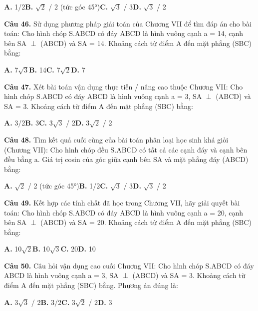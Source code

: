 \documentclass[11pt,a4paper]{article}
\begin{document}
\hspace*{1.5em}\textbf{A.} 1/2\quad\quad \textbf{B.} $\sqrt{2}$ / 2 (tức góc 45°)\quad\quad \textbf{C.} $\sqrt{3}$ / 3\quad\quad \textbf{D.} $\sqrt{3}$ / 2\par\vspace{2pt}
\textbf{\color{primary} Câu 46.} Sử dụng phương pháp giải toán của Chương VII để tìm đáp án cho bài toán: Cho hình chóp S.ABCD có đáy ABCD là hình vuông cạnh a = 14, cạnh bên SA $\perp$ (ABCD) và SA = 14. Khoảng cách từ điểm A đến mặt phẳng (SBC) bằng:\par
\hspace*{1.5em}\textbf{A.} 7$\sqrt{3}$\quad\quad \textbf{B.} 14\quad\quad \textbf{C.} 7$\sqrt{2}$\quad\quad \textbf{D.} 7\par\vspace{2pt}
\textbf{\color{primary} Câu 47.} Xét bài toán vận dụng thực tiễn / nâng cao thuộc Chương VII: Cho hình chóp S.ABCD có đáy ABCD là hình vuông cạnh a = 3, SA $\perp$ (ABCD) và SA = 3. Khoảng cách từ điểm A đến mặt phẳng (SBC) bằng:\par
\hspace*{1.5em}\textbf{A.} 3/2\quad\quad \textbf{B.} 3\quad\quad \textbf{C.} 3$\sqrt{3}$ / 2\quad\quad \textbf{D.} 3$\sqrt{2}$ / 2\par\vspace{2pt}
\textbf{\color{primary} Câu 48.} Tìm kết quả cuối cùng của bài toán phân loại học sinh khá giỏi (Chương VII): Cho hình chóp đều S.ABCD có tất cả các cạnh đáy và cạnh bên đều bằng a. Giá trị cosin của góc giữa cạnh bên SA và mặt phẳng đáy (ABCD) bằng:\par
\hspace*{1.5em}\textbf{A.} $\sqrt{2}$ / 2 (tức góc 45°)\quad\quad \textbf{B.} 1/2\quad\quad \textbf{C.} $\sqrt{3}$ / 3\quad\quad \textbf{D.} $\sqrt{3}$ / 2\par\vspace{2pt}
\textbf{\color{primary} Câu 49.} Kết hợp các tính chất đã học trong Chương VII, hãy giải quyết bài toán: Cho hình chóp S.ABCD có đáy ABCD là hình vuông cạnh a = 20, cạnh bên SA $\perp$ (ABCD) và SA = 20. Khoảng cách từ điểm A đến mặt phẳng (SBC) bằng:\par
\hspace*{1.5em}\textbf{A.} 10$\sqrt{2}$\quad\quad \textbf{B.} 10$\sqrt{3}$\quad\quad \textbf{C.} 20\quad\quad \textbf{D.} 10\par\vspace{2pt}
\textbf{\color{primary} Câu 50.} Câu hỏi vận dụng cao cuối Chương VII: Cho hình chóp S.ABCD có đáy ABCD là hình vuông cạnh a = 3, SA $\perp$ (ABCD) và SA = 3. Khoảng cách từ điểm A đến mặt phẳng (SBC) bằng. Phương án đúng là:\par
\hspace*{1.5em}\textbf{A.} 3$\sqrt{3}$ / 2\quad\quad \textbf{B.} 3/2\quad\quad \textbf{C.} 3$\sqrt{2}$ / 2\quad\quad \textbf{D.} 3\par\vspace{2pt}
\end{document}
